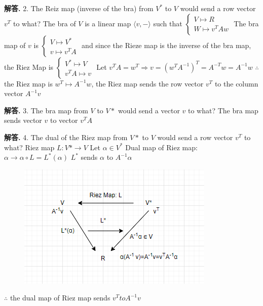 \documentclass[12pt, a4paper, oneside]{article}
\newenvironment{solution}{\par\noindent\textbf{解答. }}{\par}
\begin{document}
\begin{CJK}{UTF8}{gbsn}
\begin{solution} 
  2. The Reiz map (inverse of the bra) from $V^*$ to $V$ would send a row vector $v^T$ to what? \newline
  The bra of $V$ is a linear map $\langle v, - \rangle$ such that $\begin{cases}
    V\mapsto R \\
    W\mapsto v^TAw
  \end{cases}$ \newline
  The bra map of $v$ is $\begin{cases}
     V \mapsto V^* \\
     v \mapsto v^TA
  \end{cases}$ \newline
  and since the Rieze map is the inverse of the bra map, the Riez Map is $\begin{cases}
    V^* \mapsto V \\
    v^TA \mapsto v
  \end{cases}$ \newline
  Let $v^TA=w^T \Rightarrow v = (w^TA^{-1})^T=A^{-T}w=A^{-1}w$ \newline
  $\therefore$ the Riez map is $w^T \mapsto A^{-1}w$, the Riez map sends the row vector $v^T$ to the column vector $A^{-1}v$
  \end{solution}

\begin{solution}
  3. The bra map from $V$ to $V*$ would send a vector $v$ to what? \newline
  The bra map sends vector $v$ to vector $v^TA$
\end{solution}

\begin{solution}
  4. The dual of the Riez map from $V*$ to $V$ would send a row vector $v^T$ to what? \newline
  Riez map $L:V*\rightarrow V$ \newline
  Let $\alpha \in V^*$ \newline
  Dual map of Riez map: $\alpha \rightarrow \alpha \circ L = L^*(\alpha)$ \newline
  $L^*$ sends $\alpha$ to $A^{-1}\alpha$ \newline
  \begin{figure}[h]
    \includegraphics{image-20220513140213513.png}
    \centering
  \end{figure}
  $\therefore$ the dual map of Riez map sends $v^T to A^{-1}v$
\end{solution}


\end{CJK}
\end{document}

